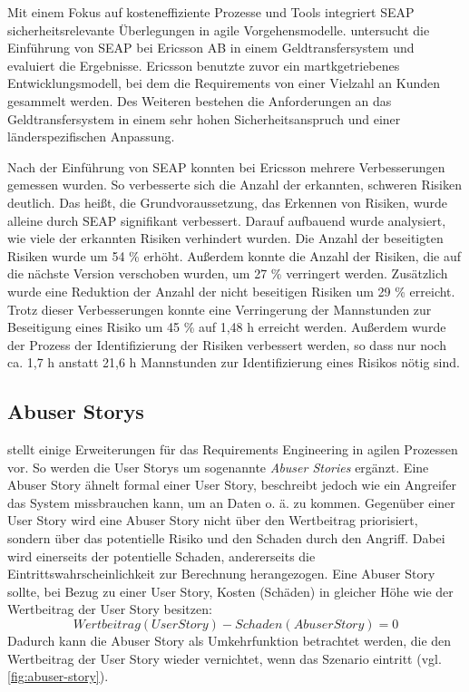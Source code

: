 Mit einem Fokus auf kosteneffiziente Prozesse und Tools integriert SEAP sicherheitsrelevante Überlegungen in agile Vorgehensmodelle.
\parencite[][]{Baca:2015aa} untersucht die Einführung von SEAP bei Ericsson AB in einem Geldtransfersystem und evaluiert die Ergebnisse.
Ericsson benutzte zuvor ein martkgetriebenes Entwicklungsmodell, bei dem die Requirements von einer Vielzahl an Kunden gesammelt werden.
Des Weiteren bestehen die Anforderungen an das Geldtransfersystem in einem sehr hohen Sicherheitsanspruch und einer länderspezifischen Anpassung.

Nach der Einführung von SEAP konnten bei Ericsson mehrere Verbesserungen gemessen wurden.
So verbesserte sich die Anzahl der erkannten, schweren Risiken deutlich. 
Das heißt, die Grundvoraussetzung, das Erkennen von Risiken, wurde alleine durch SEAP signifikant verbessert.
Darauf aufbauend wurde analysiert, wie viele der erkannten Risiken verhindert wurden.
Die Anzahl der beseitigten Risiken wurde um 54 \% erhöht.
Außerdem konnte die Anzahl der Risiken, die auf die nächste Version verschoben wurden, um 27 \% verringert werden.
Zusätzlich wurde eine Reduktion der Anzahl der nicht beseitigen Risiken um 29 \% erreicht.
Trotz dieser Verbesserungen konnte eine Verringerung der Mannstunden zur Beseitigung eines Risiko um 45 \% auf 1,48 h erreicht werden.
Außerdem wurde der Prozess der Identifizierung der Risiken verbessert werden, so dass nur noch ca. 1,7 h anstatt 21,6 h Mannstunden zur Identifizierung eines Risikos nötig sind.
\parencite[Vgl.][S. 17 f.]{Baca:2015aa}

\subsection{Abuser Storys} 

\parencite[][]{peeters2005agile} stellt einige Erweiterungen für das Requirements Engineering in agilen Prozessen vor.
So werden die User Storys um sogenannte \emph{Abuser Stories} ergänzt.
Eine Abuser Story ähnelt formal einer User Story, beschreibt jedoch wie ein Angreifer das System missbrauchen kann, um an Daten o. ä. zu kommen.
Gegenüber einer User Story wird eine Abuser Story nicht über den Wertbeitrag priorisiert, sondern über das potentielle Risiko und den Schaden durch den Angriff.
Dabei wird einerseits der potentielle Schaden, andererseits die Eintrittswahrscheinlichkeit zur Berechnung herangezogen.
Eine Abuser Story sollte, bei Bezug zu einer User Story, Kosten (Schäden) in gleicher Höhe wie der Wertbeitrag der User Story besitzen:
$$Wertbeitrag(UserStory) - Schaden(AbuserStory) = 0$$
Dadurch kann die Abuser Story als Umkehrfunktion betrachtet werden, die den Wertbeitrag der User Story wieder vernichtet, wenn das Szenario eintritt (vgl. \autoref{fig:abuser-story}).

